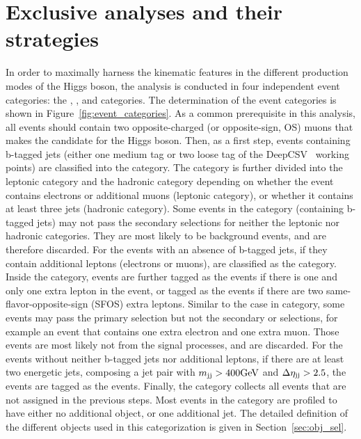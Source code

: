 \section{Exclusive analyses and their strategies}\label{sec:hmm_cat_and_strategy}
In order to maximally harness the kinematic features in the different production modes of the Higgs boson,
the analysis is conducted in four independent event categories: the \ggH, \qqH, \VH and \ttH categories.
The determination of the event categories is shown in Figure~\ref{fig:event_categories}.
As a common prerequisite in this analysis, all events should contain two opposite-charged (or opposite-sign, OS) muons that makes the candidate for the Higgs boson. 
Then, as a first step, events containing b-tagged jets (either one medium tag or two loose tag of the DeepCSV~\cite{Sirunyan:2017ezt} working points) are classified into the \ttH category.
The \ttH category is further divided into the \ttH leptonic category and the \ttH hadronic category depending on whether the event contains electrons or additional muons (leptonic category), 
or whether it contains at least three jets (hadronic category).
Some events in the \ttH category (containing b-tagged jets) may not pass the secondary selections for neither the leptonic nor hadronic categories.
They are most likely to be background events, and are therefore discarded.
For the events with an absence of b-tagged jets, if they contain additional leptons (electrons or muons), are classified as the \VH category.
Inside the \VH category, events are further tagged as the \WH events if there is one and only one extra lepton in the event, 
or tagged as the \ZH events if there are two same-flavor-opposite-sign (SFOS) extra leptons.
Similar to the case in \ttH category, some events may pass the primary \VH selection but not the secondary \WH or \ZH selections, 
for example an event that contains one extra electron and one extra muon.
Those events are most likely not from the signal processes, and are discarded.
For the events without neither b-tagged jets nor additional leptons, if there are at least two energetic jets, 
composing a jet pair with $m_{\mathrm{jj}}>400\mbox{GeV}$ and $\Delta\eta_{\mathrm{jj}}>2.5$, the events are tagged as the \qqH events.
Finally, the \ggH category collects all events that are not assigned in the previous steps. 
Most events in the \ggH category are profiled to have either no additional object, or one additional jet.
The detailed definition of the different objects used in this categorization is given in Section~\ref{sec:obj_sel}.

